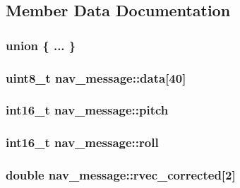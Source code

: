 \subsection{Member Data Documentation}
\hypertarget{structnav__message_aa5a224ab5d7821bb000c2085c71a13ba}{\subsubsection[{"@9}]{\setlength{\rightskip}{0pt plus 5cm}union \{ ... \} }}\label{structnav__message_aa5a224ab5d7821bb000c2085c71a13ba}
\hypertarget{structnav__message_aefc019e701a7c34f352fca4f15f54e6f}{
\subsubsection[{data}]{\setlength{\rightskip}{0pt plus 5cm}uint8\-\_\-t nav\-\_\-message\-::data\mbox{[}40\mbox{]}}}\label{structnav__message_aefc019e701a7c34f352fca4f15f54e6f}
\hypertarget{structnav__message_af6064924eb9301edcf3d8bfbe6443bb3}{
\subsubsection[{pitch}]{\setlength{\rightskip}{0pt plus 5cm}int16\-\_\-t nav\-\_\-message\-::pitch}}\label{structnav__message_af6064924eb9301edcf3d8bfbe6443bb3}
\hypertarget{structnav__message_a5a9f998f05f761c0ef2ecc4f421e56fa}{
\subsubsection[{roll}]{\setlength{\rightskip}{0pt plus 5cm}int16\-\_\-t nav\-\_\-message\-::roll}}\label{structnav__message_a5a9f998f05f761c0ef2ecc4f421e56fa}
\hypertarget{structnav__message_ae77c9ce12a1b1d950b9c4e7a8eb95ffb}{
\subsubsection[{rvec\-\_\-corrected}]{\setlength{\rightskip}{0pt plus 5cm}double nav\-\_\-message\-::rvec\-\_\-corrected\mbox{[}2\mbox{]}}}\label{structnav__message_ae77c9ce12a1b1d950b9c4e7a8eb95ffb}

